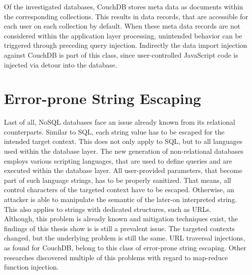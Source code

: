Of the investigated databases, CouchDB stores meta data as documents within the corresponding collections. This results in data records, that are accessible for each user on each collection by default. When these meta data records are not considered within the application layer processing, unintended behavior can be triggered through preceding query injection. Indirectly the data import injection against CouchDB is part of this class, since user-controlled JavaScript code is injected via detour into the database.


\section{Error-prone String Escaping}

Last of all, NoSQL databases face an issue already known from its relational counterparts. Similar to SQL, each string value has to be escaped for the intended target context. This does not only apply to SQL, but to all languages used within the database layer. The new generation of non-relational databases employs various scripting languages, that are used to define queries and are executed within the database layer. All user-provided parameters, that become part of such language strings, has to be properly sanitized. That means, all control characters of the targeted context have to be escaped. Otherwise, an attacker is able to manipulate the semantic of the later-on interpreted string. This also applies to strings with dedicated structures, such as URLs. \\

Although, this problem is already known and mitigation techniques exist, the findings of this thesis show is is still a prevalent issue. The targeted contexts changed, but the underlying problem is still the same. URL traversal injections, as found for CouchDB, belong to this class of error-prone string escaping. Other researches discovered multiple of this problems with regard to map-reduce function injection. \\

